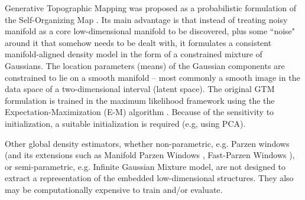 
Generative Topographic Mapping \cite[GTM, ][]{Bishop1998GTMTG} was proposed as a probabilistic formulation of the Self-Organizing Map \citep{Kohonen1982}.
Its main advantage is that instead of treating noisy manifold as a core low-dimensional manifold to be discovered,
plus some ``noise" around it that somehow needs to be dealt with, 
it formulates a consistent manifold-aligned density model in the form of a constrained mixture of Gaussians.
The location parameters (means) of the Gaussian components are constrained to lie on a smooth manifold 
-- most commonly a smooth image in the data space of a two-dimensional interval (latent space). 
The original GTM formulation is trained in the maximum likelihood framework using the the Expectation-Maximization (E-M) algorithm \citep{10.2307/2984875}.
Because of the sensitivity to initialization, a suitable initialization is required (e.g, using PCA).

Other global density estimators, whether non-parametric, e.g. Parzen windows \cite{parzen1962estimation}
(and its extensions such as Manifold Parzen Windows \cite{NIPS2002_2203}, Fast-Parzen Windows \cite{5178637}),
or semi-parametric, e.g. Infinite Gaussian Mixture model\cite{10.5555/3009657.3009736},
are not designed to extract a representation of the embedded low-dimensional structures.
They also may be computationally expensive to train and/or evaluate. 


